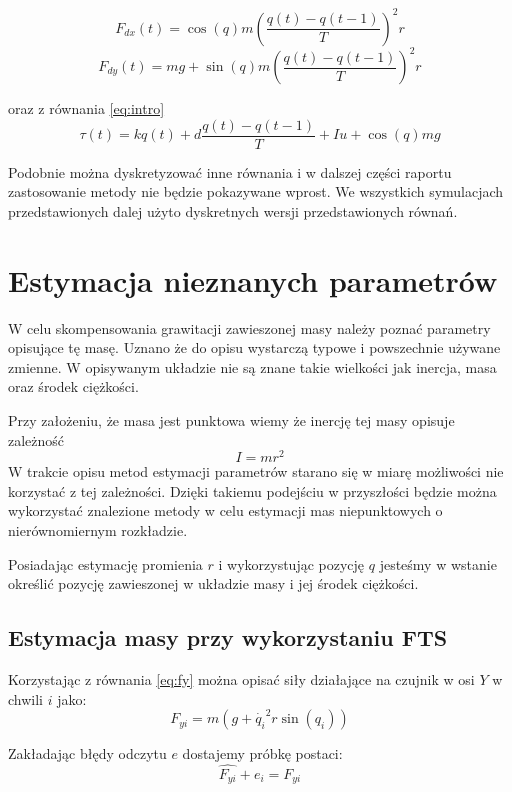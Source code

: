 \documentclass[a4paper, 10pt]{article}
\begin{document}
\begin{equation}
F_{dx}(t) = \cos{(q)}m(\frac{q(t)-q(t-1)}{T})^2 r
\end{equation}
\begin{equation}
F_{dy}(t) = mg + \sin{(q)}m(\frac{q(t)-q(t-1)}{T})^2 r
\end{equation}

oraz z równania \ref{eq:intro}
\begin{equation}
\tau(t) = kq(t) + d\frac{q(t)-q(t-1)}{T} + Iu + \cos(q)mg
\end{equation}

Podobnie można dyskretyzować inne równania i w dalszej części raportu zastosowanie metody nie będzie pokazywane wprost. We wszystkich symulacjach przedstawionych dalej użyto dyskretnych wersji przedstawionych równań.

\section{Estymacja nieznanych parametrów}
W celu skompensowania grawitacji zawieszonej masy należy poznać parametry opisujące tę masę. Uznano że do opisu wystarczą typowe i powszechnie używane zmienne. W opisywanym układzie nie są znane takie wielkości jak inercja, masa oraz środek ciężkości.

Przy założeniu, że masa jest punktowa wiemy że inercję tej masy opisuje zależność
\begin{equation}
I = mr^2
\end{equation}
W trakcie opisu metod estymacji parametrów starano się w miarę możliwości nie korzystać z tej zależności. Dzięki takiemu podejściu w przyszłości będzie można wykorzystać znalezione metody w celu estymacji mas niepunktowych o nierównomiernym rozkładzie.

Posiadając estymację promienia $r$ i wykorzystując pozycję $q$ jesteśmy w wstanie określić pozycję zawieszonej w układzie masy i jej środek ciężkości.


\subsection{Estymacja masy przy wykorzystaniu FTS}
\label{sec:ftsods}
Korzystając z równania \ref{eq:fy} można opisać siły działające na czujnik w osi $Y$ w chwili $i$ jako:
\begin{equation}
F_{yi}  = m(g + \dot{q_i}^2r\sin{(q_i)})
\end{equation}

Zakładając błędy odczytu $e$ dostajemy próbkę postaci:
\begin{equation}
\hat{F_{yi}}+e_i  = F_{yi}
\end{equation}
\end{document}
